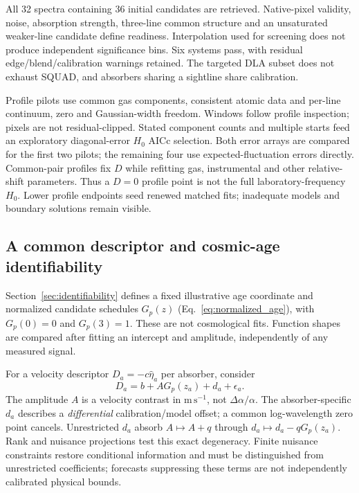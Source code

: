 All 32 spectra containing 36 initial candidates are retrieved. Native-pixel validity, noise, absorption strength, three-line common structure and an unsaturated weaker-line candidate define readiness. Interpolation used for screening does not produce independent significance bins. Six systems pass, with residual edge/blend/calibration warnings retained. The targeted DLA subset does not exhaust SQUAD, and absorbers sharing a sightline share calibration.

Profile pilots use common gas components, consistent atomic data and per-line continuum, zero and Gaussian-width freedom. Windows follow profile inspection; pixels are not residual-clipped. Stated component counts and multiple starts feed an exploratory diagonal-error $H_0$ AICc selection. Both error arrays are compared for the first two pilots; the remaining four use expected-fluctuation errors directly. Common-pair profiles fix $D$ while refitting gas, instrumental and other relative-shift parameters. Thus a $D=0$ profile point is not the full laboratory-frequency $H_0$. Lower profile endpoints seed renewed matched fits; inadequate models and boundary solutions remain visible.

\subsection{A common descriptor and cosmic-age identifiability}
\label{sec:age_methods}
Section~\ref{sec:identifiability} defines a fixed illustrative age coordinate and normalized candidate schedules $G_p(z)$ (Eq.~\ref{eq:normalized_age}), with $G_p(0)=0$ and $G_p(3)=1$. These are not cosmological fits. Function shapes are compared after fitting an intercept and amplitude, independently of any measured signal.

For a velocity descriptor $D_a=-c\widehat\eta_a$ per absorber, consider
\begin{equation}
 D_a=b+A G_p(z_a)+d_a+\epsilon_a.
 \label{eq:age_nuisance}
\end{equation}
The amplitude $A$ is a velocity contrast in $\mathrm{m\,s^{-1}}$, not $\Delta\alpha/\alpha$. The absorber-specific $d_a$ describes a \emph{differential} calibration/model offset; a common log-wavelength zero point cancels. Unrestricted $d_a$ absorb $A\mapsto A+q$ through $d_a\mapsto d_a-qG_p(z_a)$. Rank and nuisance projections test this exact degeneracy. Finite nuisance constraints restore conditional information and must be distinguished from unrestricted coefficients; forecasts suppressing these terms are not independently calibrated physical bounds.
